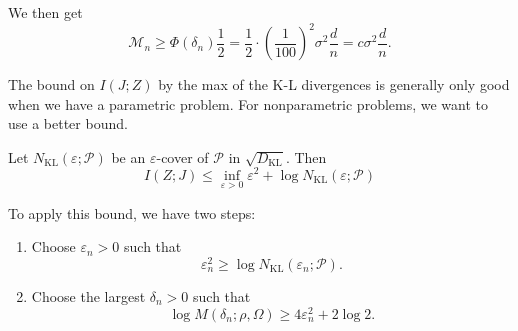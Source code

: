 \begin{exam}
    We then get
    \begin{equation*}
        \mathcal{M}_n \geq \Phi(\delta_n) \frac{1}{2} = \frac{1}{2} \cdot \left( \frac{1}{100} \right)^2 \sigma^2 \frac{d}{n} = c \sigma^2 \frac{d}{n}.
    \end{equation*}
\end{exam}

The bound on $I(J;Z)$ by the max of the K-L divergences is generally only good when we have a parametric problem. For nonparametric problems, we want to use a better bound.

\begin{lem}
    Let $N_{\mathrm{KL}}(\varepsilon; \mathcal{P})$ be an $\varepsilon$-cover of $\mathcal{P}$ in $\sqrt{D_{\mathrm{KL}}}$. Then
    \begin{equation*}
        I(Z;J) \leq \inf_{\varepsilon > 0} \varepsilon^2 + \log N_{\mathrm{KL}}(\varepsilon; \mathcal{P})
    \end{equation*}
\end{lem}

To apply this bound, we have two steps:
\begin{enumerate}
    \item Choose $\varepsilon_n > 0$ such that
    \begin{equation*}
        \varepsilon_n^2 \geq \log N_{\mathrm{KL}}(\varepsilon_n; \mathcal{P}).
    \end{equation*}
    \item Choose the largest $\delta_n > 0$ such that
    \begin{equation*}
        \log M(\delta_n; \rho, \Omega) \geq 4\varepsilon_n^2 + 2 \log 2.
    \end{equation*}
\end{enumerate}
